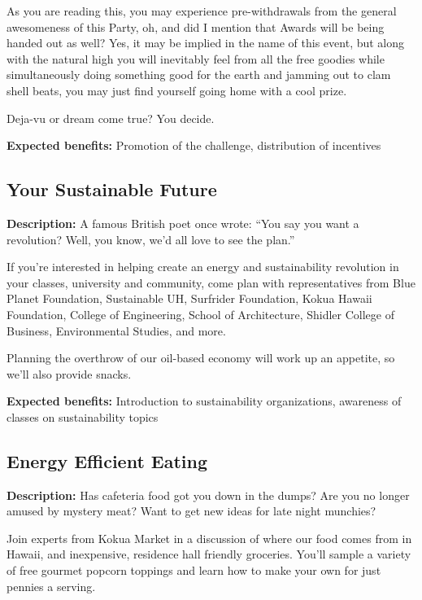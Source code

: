 As you are reading this, you may experience pre-withdrawals from the general awesomeness of this Party, oh, and did I mention that Awards will be being handed out as well? Yes, it may be implied in the name of this event, but along with the natural high you will inevitably feel from all the free goodies while simultaneously doing something good for the earth and jamming out to clam shell beats, you may just find yourself going home with a cool prize. 

Deja-vu or dream come true? You decide.

\vspace{2ex}
\textbf{Expected benefits:} Promotion of the challenge, distribution of incentives


\subsection{Your Sustainable Future}

\textbf{Description:} A famous British poet once wrote: ``You say you want a revolution? Well, you know, we'd all love to see the plan.''

If you're interested in helping create an energy and sustainability revolution in your classes, university and community, come plan with representatives from Blue Planet Foundation, Sustainable UH, Surfrider Foundation, Kokua Hawaii Foundation, College of Engineering, School of Architecture, Shidler College of Business, Environmental Studies, and more.

Planning the overthrow of our oil-based economy will work up an appetite, so we'll also provide snacks.

\vspace{2ex}
\textbf{Expected benefits:} Introduction to sustainability organizations, awareness of classes on sustainability topics


\subsection{Energy Efficient Eating}

\textbf{Description:} Has cafeteria food got you down in the dumps? Are you no longer amused by mystery meat? Want to get new ideas for late night munchies?

Join experts from Kokua Market in a discussion of where our food comes from in Hawaii, and inexpensive, residence hall friendly groceries. You'll sample a variety of free gourmet popcorn toppings and learn how to make your own for just pennies a serving.


